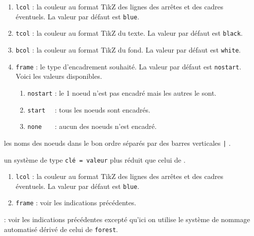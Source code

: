 \documentclass[12pt,a4paper]{article}
\begin{document}
\begin{enumerate}    
    \item \verb#lcol# : la couleur au format TikZ des lignes des arrêtes et des cadres éventuels. La valeur par défaut est \verb#blue#.

    \item \verb#tcol# : la couleur au format TikZ du texte. La valeur par défaut est \verb#black#.

    \item \verb#bcol# : la couleur au format TikZ du fond. La valeur par défaut est \verb#white#.
    
    \extraspace
    
    \item \verb#frame# : le type d'encadrement souhaité. La valeur par défaut est \verb#nostart#. Voici les valeurs disponibles.
    \begin{enumerate}
    	\item \verb#nostart# : le 1\ier{} noeud n'est pas encadré mais les autres le sont.

    	\item \verb#start  # : tous les noeuds sont encadrés. 

    	\item \verb#none   # : aucun des noeuds n'est encadré.
    \end{enumerate}
\end{enumerate}

\IDarg{} les noms des noeuds dans le bon ordre séparés par des barres verticales \verb#|# .


\bigskip



\IDoption{} un système de type \texttt{clé = valeur} plus réduit que celui de .

\begin{enumerate}    
    \item \verb#lcol# : la couleur au format TikZ des lignes des arrêtes et des cadres éventuels. La valeur par défaut est \verb#blue#.

    \extraspace
    
    \item \verb#frame# : voir les indications précédentes.
\end{enumerate}

\IDarg{} : voir les indications précédentes excepté qu'ici on utilise le système de nommage automatisé dérivé de celui de \verb#forest#.
\end{document}
